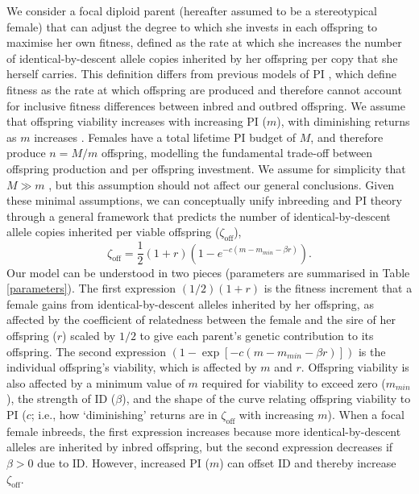 \documentclass[12pt]{article}
\begin{document}
We consider a focal diploid parent (hereafter assumed to be a stereotypical female) that can adjust the degree to which she invests in each offspring to maximise her own fitness, defined as the rate at which she increases the number of identical-by-descent allele copies inherited by her offspring per copy that she herself carries. This definition differs from previous models of PI \cite[e.g.,][]{Macnair1978, Parker1978}, which define fitness as the rate at which offspring are produced and therefore cannot account for inclusive fitness differences between inbred and outbred offspring. We assume that offspring viability increases with increasing PI ($m$), with diminishing returns as $m$ increases \cite[following][]{Parker1978}. Females have a total lifetime PI budget of $M$, and therefore produce $n=M/m$ offspring, modelling the fundamental trade-off between offspring production and per offspring investment. We assume for simplicity that $M \gg m$ \cite[following][]{Parker1985}, but this assumption should not affect our general conclusions. Given these minimal assumptions, we can conceptually unify inbreeding and PI theory through a general framework that predicts the number of identical-by-descent allele copies inherited per viable offspring ($\zeta_{\textrm{off}}$),
\begin{equation} \label{maineq}
\zeta_{\textrm{off}} = \frac{1}{2}\left(1+r\right)\left(1-e^{-c\left(m-m_{min}-\beta r\right)}\right).
\end{equation}
Our model can be understood in two pieces (parameters are summarised in Table \ref{parameters}). The first expression $\left(1/2\right) \left(1 + r\right)$ is the fitness increment that a female gains from identical-by-descent alleles inherited by her offspring, as affected by the coefficient of relatedness between the female and the sire of her offspring ($r$) scaled by $1/2$ to give each parent's genetic contribution to its offspring. The second expression $\left(1 - \exp\left[-c\left(m-m_{min}-\beta r\right)\right]\right)$ is the individual offspring's viability, which is affected by $m$ and $r$. Offspring viability is also affected by a minimum value of $m$ required for viability to exceed zero ($m_{min}$), the strength of ID ($\beta$), and the shape of the curve relating offspring viability to PI ($c$; i.e., how `diminishing' returns are in $\zeta_{\textrm{off}}$ with increasing $m$). When a focal female inbreeds, the first expression increases because more identical-by-descent alleles are inherited by inbred offspring, but the second expression decreases if $\beta>0$ due to ID. However, increased PI ($m$) can offset ID and thereby increase $\zeta_{\textrm{off}}$. 
\end{document}
